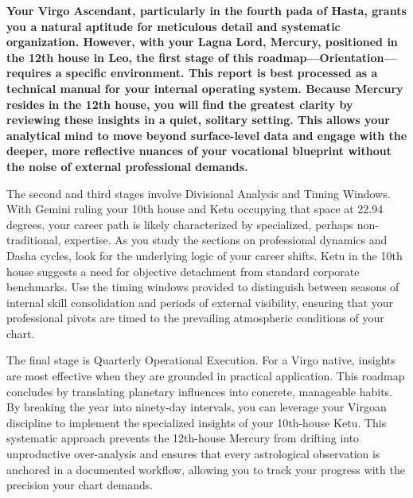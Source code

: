 
\label{topic4}

{\fontsize{9.5}{13.8}\selectfont\bfseries\color{DeepSlate} Your Virgo Ascendant, particularly in the fourth pada of Hasta, grants you a natural aptitude for meticulous detail and systematic organization. However, with your Lagna Lord, Mercury, positioned in the 12th house in Leo, the first stage of this roadmap---Orientation---requires a specific environment. This report is best processed as a technical manual for your internal operating system. Because Mercury resides in the 12th house, you will find the greatest clarity by reviewing these insights in a quiet, solitary setting. This allows your analytical mind to move beyond surface-level data and engage with the deeper, more reflective nuances of your vocational blueprint without the noise of external professional demands.}\par\vspace{2mm}

{\fontsize{9}{13}\selectfont The second and third stages involve Divisional Analysis and Timing Windows. With Gemini ruling your 10th house and Ketu occupying that space at 22.94 degrees, your career path is likely characterized by specialized, perhaps non-traditional, expertise. As you study the sections on professional dynamics and Dasha cycles, look for the underlying logic of your career shifts. Ketu in the 10th house suggests a need for objective detachment from standard corporate benchmarks. Use the timing windows provided to distinguish between seasons of internal skill consolidation and periods of external visibility, ensuring that your professional pivots are timed to the prevailing atmospheric conditions of your chart.}\par\vspace{1.8mm}

{\fontsize{9}{13}\selectfont The final stage is Quarterly Operational Execution. For a Virgo native, insights are most effective when they are grounded in practical application. This roadmap concludes by translating planetary influences into concrete, manageable habits. By breaking the year into ninety-day intervals, you can leverage your Virgoan discipline to implement the specialized insights of your 10th-house Ketu. This systematic approach prevents the 12th-house Mercury from drifting into unproductive over-analysis and ensures that every astrological observation is anchored in a documented workflow, allowing you to track your progress with the precision your chart demands.}\par\vspace{1.8mm}

